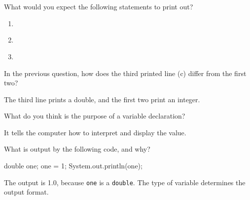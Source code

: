 \Q What would you expect the following statements to print out?

\begin{enumerate}
\item {}          
\item {}\texttt{~~} 
\item {}\texttt{~~} 
\end{enumerate}


\Q In the previous question, how does the third printed line (c) differ from the first two?

\begin{answer}
The third line prints a double, and the first two print an integer.
\end{answer}


\Q \label{vardecl}
What do you think is the purpose of a variable declaration?

\begin{answer}
It tells the computer how to interpret and display the value.
\end{answer}


\Q What is output by the following code, and why?

\begin{minipage}[t]{0.33\linewidth}

\vspace{-2ex}
\begin{javalst}
double one;
one = 1;
System.out.println(one);
\end{javalst}

\end{minipage}
\hfill
\begin{minipage}[t]{0.66\linewidth}

\begin{answer}[3em]
The output is 1.0, because {\tt one} is a {\tt double}.
The type of variable determines the output format.
\end{answer}

\end{minipage}
